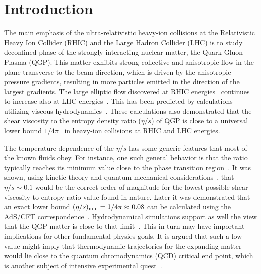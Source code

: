 
\section{Introduction}


The main emphasis of the ultra-relativistic heavy-ion collisions at the Relativistic Heavy Ion Collider (RHIC) and the Large Hadron Collider (LHC) is to study deconfined phase of the strongly interacting nuclear matter, the Quark-Gluon Plasma (QGP). 
This matter exhibits strong collective and anisotropic flow in the plane transverse to the beam direction, which is driven by the anisotropic pressure gradients, resulting in more particles emitted in the direction of the largest gradients.
The large elliptic flow discovered at RHIC energies~\cite{Ackermann:2000tr} continues to increase also at LHC energies~\cite{Aamodt:2010pa,Adam:2016izf}. This has been predicted by calculations utilizing viscous hydrodynamics~\cite{Romatschke:2007mq,Shen:2011eg,Schenke:2011zz,Bozek:2012qs,Gale:2012rq,Hirano:2010je}.
These calculations also demonstrated that the shear viscosity to the entropy density ratio ($\eta/s$) of QGP is close to a universal lower bound $1/4\pi$~\cite{Kovtun:2004de} in heavy-ion collisions at RHIC and LHC energies.

The temperature dependence of the $\eta/s$ has some generic features that most of the known fluids obey. For instance, one such general behavior is that the ratio typically reaches its minimum value close to the phase transition region~\cite{Lacey:2006bc}. 
It was shown, using kinetic theory and quantum mechanical considerations~\cite{PhysRevD.31.53}, that $\eta/s\sim0.1$ would be the correct order of magnitude for the lowest possible shear viscosity to entropy ratio value found in nature. Later it was demonstrated that an exact lower bound $(\eta/s)_{\rm min}=1/4\pi\approx0.08$ can be calculated using the AdS/CFT correspondence~\cite{Kovtun:2004de}. Hydrodynamical simulations support as well the view that the QGP matter is close to that limit~\cite{Gale:2012rq}. This in turn may have important implications for other fundamental physics goals. It is argued that such a low value might imply that thermodynamic trajectories for the expanding matter would lie close to the quantum chromodynamics (QCD) critical end point, which is another subject of intensive experimental quest~\cite{Lacey:2006bc}.

